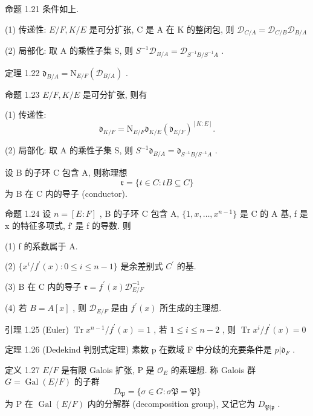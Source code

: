 \documentclass[]{article}
\begin{document}
{命题 1.21 条件如上.  

(1) 传递性: $E / F , K / E$ 是可分扩张, C 是 A 在 K 的整闭包, 则 $\mathcal { D } _ { C / A } = \mathcal { D } _ { C / B } \mathcal { D } _ { B / A }$ 

(2) 局部化: 取 A 的乘性子集 S, 则 $S ^ { - 1 } \mathcal { D } _ { B / A } = \mathcal { D } _ { S ^ { - 1 } B / S ^ { - 1 } A }$ . 

定理 1.22 $\mathfrak { d } _ { B / A } = \mathrm { N } _ { E / F } ( \mathcal { D } _ { B / A } )$ . 

命题 1.23 $E / F , K / E$ 是可分扩张, 则有 

(1) 传递性: $$
\mathfrak {d} _ {K / F} = \mathrm{N} _ {E / F} \mathfrak {d} _ {K / E} (\mathfrak {d} _ {E / F}) ^ {[ K: E ]}.
$$

(2) 局部化: 取 A 的乘性子集 S, 则 $S ^ { - 1 } \mathfrak { d } _ { B / A } = \mathfrak { d } _ { S ^ { - 1 } B / S ^ { - 1 } A }$ . 

设 B 的子环 C 包含 A, 则称理想$$
\mathfrak {r} = \{t \in C: t B \subseteq C \}
$$ 为 B 在 C 内的导子 (conductor). 

命题 1.24 设 $n = [ E : F ]$ , B 的子环 C 包含 A, $\{ 1 , x , \ldots , x ^ { n - 1 } \}$ 是 C 的 A 基, f 是 x 的特征多项式, f′ 是 f 的导数. 则  

(1) f 的系数属于 A. 

(2) $\{ x ^ { i } / f ^ { \prime } ( x ) : 0 \leqslant i \leqslant n - 1 \}$ 是余差别式 $C ^ { \prime }$ 的基. 

(3) B 在 C 内的导子 ${ \mathfrak { r } } = f ^ { \prime } ( x ) { \mathcal { D } } _ { E / F } ^ { - 1 }$ 

(4) 若 $B = A [ x ]$ , 则 $\mathcal { D } _ { E / F }$ 是由 $f ^ { \prime } ( x )$ 所生成的主理想. 

引理 1.25 (Euler) $\operatorname { T r } x ^ { n - 1 } / f ^ { \prime } ( x ) = 1$ , 若 $1 \leqslant i \leqslant n - 2$ , 则 $\operatorname { T r } x ^ { i } / f ^ { \prime } ( x ) = 0$ 

定理 1.26 (Dedekind 判别式定理) 素数 p 在数域 F 中分歧的充要条件是 $p | \mathfrak { d } _ { F }$ . 

定义 1.27 $E / F$ 是有限 Galois 扩张, P 是 $\mathcal { O } _ { E }$ 的素理想. 称 Galois 群 $G = \operatorname { G a l } ( E / F )$ 的子群 $$
D _ {\mathfrak {P}} = \{\sigma \in G: \sigma \mathfrak {P} = \mathfrak {P} \}
$$为 P 在 $\operatorname { G a l } ( E / F )$ 内的分解群 (decomposition group), 又记它为 $D _ { \mathfrak { P } | { \mathfrak { p } } }$ . 

}
\end{document}
